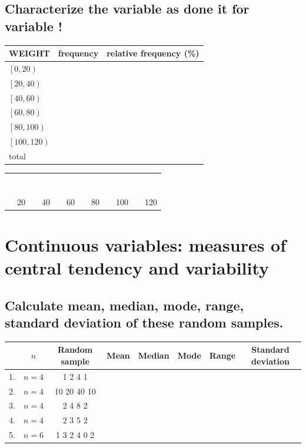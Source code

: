 \subsection{Characterize the  variable as done it for variable !}

	\begin{center}\small
		\begin{tabular}{l|l|l}
		\toprule
		WEIGHT		& frequency	& relative frequency (\%)\\
		\midrule		
	$\left[0,20\right)$&&\\
	$\left[20,40\right)$&&\\
	$\left[40,60\right)$&&\\
	$\left[60,80\right)$&&\\
	$\left[80,100\right)$&&\\
	$\left[100,120\right)$&&\\										
		\midrule
		total&&\\
		\bottomrule
		\end{tabular}		
		\hfill\footnotesize
		\begin{tabular}{|llllllllllll}
		&&\\\\\\\\\\\\\\
		\hline
		\multicolumn{1}{l}{}& 20 && 40 && 60 && 80 && 100&& 120
		\end{tabular}
	\end{center}
\section{Continuous variables: measures of central tendency and variability}
\subsection{Calculate mean, median, mode, range, standard deviation of these random samples.}\label{subsec:descriptive}

\begin{center}\large
	\begin{tabular}{c|c|c|c|c|c||c|c}
	\toprule
		&$n$&Random sample&
		Mean&
		Median&
		Mode&
		Range&
		Standard deviation\\		
	\midrule
		1.&$n = 4$&1 2 4 1&&&&&\\
		2.&$n = 4$&10 20 40 10&&&&&\\
		3.&$n = 4$&2 4 8 2&&&&&\\
		4.&$n = 4$&2 3 5 2&&&&&\\
		5.&$n = 6$&1 3 2 4 0 2&&&&&\\
	\bottomrule
	\end{tabular}
\end{center}



